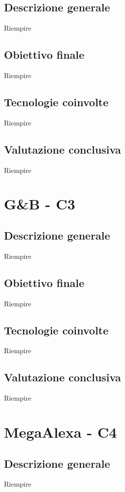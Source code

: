 		\subsection{Descrizione generale}
		Riempire
		
		\subsection{Obiettivo finale}
		Riempire
		
		\subsection{Tecnologie coinvolte}
		Riempire
		
		\subsection{Valutazione conclusiva}
		Riempire
		
	
	\section{G\&B - C3} \label{c3}
		\subsection{Descrizione generale}
		Riempire
		
		\subsection{Obiettivo finale}
		Riempire
		
		\subsection{Tecnologie coinvolte}
		Riempire
		
		\subsection{Valutazione conclusiva}
		Riempire
		
	
	\section{MegaAlexa - C4} \label{c4}
		\subsection{Descrizione generale}
		Riempire
		
